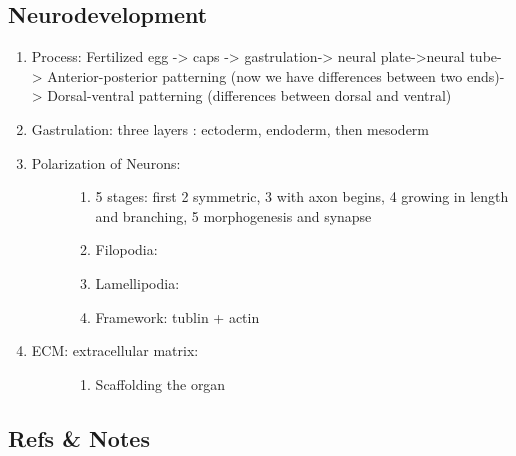 \documentclass[letterpaper,10pt,english]{sphinxmanual}
\begin{document}
\subsection{Neurodevelopment}
\label{\detokenize{neuroscience/biology:neurodevelopment}}\begin{enumerate}
\item {} 
Process:  Fertilized egg -\textgreater{} caps -\textgreater{} gastrulation-\textgreater{} neural plate-\textgreater{}neural tube-\textgreater{} Anterior-posterior patterning (now we have differences between two ends)-\textgreater{} Dorsal-ventral patterning (differences between dorsal and ventral)

\item {} 
Gastrulation: three layers : ectoderm, endoderm, then mesoderm

\item {} \begin{description}
\item[{Polarization of Neurons:}] \leavevmode\begin{enumerate}
\item {} 
5 stages: first 2 symmetric, 3 with axon begins, 4 growing in length and branching, 5 morphogenesis  and synapse

\item {} 
Filopodia:

\item {} 
Lamellipodia:

\item {} 
Framework: tublin + actin

\end{enumerate}

\end{description}

\item {} \begin{description}
\item[{ECM: extracellular matrix:}] \leavevmode\begin{enumerate}
\item {} 
Scaffolding the organ

\end{enumerate}

\end{description}

\end{enumerate}


\subsection{Refs \& Notes}
\label{\detokenize{neuroscience/biology:refs-notes}}
\end{document}
